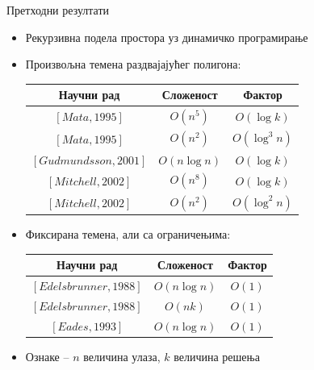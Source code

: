 \documentclass{beamer}
\begin{document}
\begin{frame}{Претходни резултати}
\begin{itemize}
\item Рекурзивна подела простора уз динамичко програмирање

\item Произвољна темена раздвајајућег полигона:
\begin{center}
\begin{tabular}{| c | c c |} \hline
Научни рад & Сложеност & Фактор\\ \hline
$[Mata, 1995]$ & $O(n^5)$ & $O(\log k)$\\
$[Mata, 1995]$ & $O(n^2)$ & $O(\log^3n)$\\
$[Gudmundsson, 2001]$ & $O(n\log n)$ & $O(\log k)$\\
$[Mitchell, 2002]$ & $O(n^8)$ & $O(\log k)$\\
$[Mitchell, 2002]$ & $O(n^2)$ & $O(\log^2n)$\\ \hline
\end{tabular}
\end{center}

\item Фиксирана темена, али са ограничењима:
\begin{center}
\begin{tabular}{| c | c c |} \hline
Научни рад & Сложеност & Фактор\\ \hline
$[Edelsbrunner, 1988]$ & $O(n\log n)$ & $O(1)$\\
$[Edelsbrunner, 1988]$ & $O(nk)$ & $O(1)$\\
$[Eades, 1993]$ & $O(n\log n)$ & $O(1)$\\ \hline
\end{tabular}
\end{center}

\item Ознаке -- $n$ величина улаза, $k$ величина решења
\end{itemize}
\end{frame}
\end{document}
